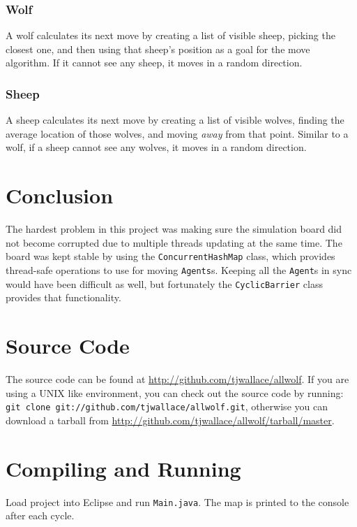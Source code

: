 \documentclass[pdftex,10pt]{article}
\begin{document}
\subsubsection{Wolf}\label{wolfMove}
A wolf calculates its next move by creating a list of visible sheep, picking the closest one, and then using that sheep's position as a goal for the move algorithm.  If it cannot see any sheep, it moves in a random direction.

\subsubsection{Sheep}\label{sheepMove}
A sheep calculates its next move by creating a list of visible wolves, finding the average location of those wolves, and moving {\em away} from that point.  Similar to a wolf, if a sheep cannot see any wolves, it moves in a random direction.

\section{Conclusion}\label{conclusion}
The hardest problem in this project was making sure the simulation board did not become corrupted due to multiple threads updating at the same time.  The board was kept stable by using the {\tt ConcurrentHashMap} class, which provides thread-safe operations to use for moving {\tt Agents}s.  Keeping all the {\tt Agent}s in sync would have been difficult as well, but fortunately the {\tt CyclicBarrier} class provides that functionality.

\appendix
\section{Source Code}
The source code can be found at \url{http://github.com/tjwallace/allwolf}.
If you are using a UNIX like environment, you can check out the source code by running: {\tt git clone git://github.com/tjwallace/allwolf.git}, otherwise you can download a tarball from \url{http://github.com/tjwallace/allwolf/tarball/master}.

\section{Compiling and Running}
Load project into Eclipse and run {\tt Main.java}.  The map is printed to the console after each cycle.
\end{document}
